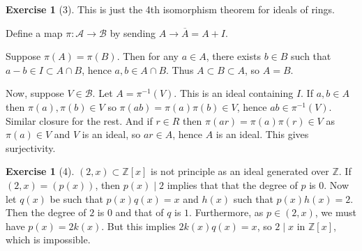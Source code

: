 \documentclass[reqno]{amsart}
\theoremstyle{definition}
\newtheorem{exercise}[theorem]{Exercise}
\theoremstyle{remark}
\begin{document}
\begin{exercise}[3]
    This is just the 4th isomorphism theorem
    for ideals of rings.

    Define a map
    $\pi \colon \mathcal{A} \to \mathcal{B}$ by
    sending $A \to \overline{A} = A + I$.

    Suppose $\pi(A) = \pi(B)$. Then
    for any $a \in A$, there exists $b \in B$ such that
    $a-b \in I \subset A \cap B$, hence
    $a,b \in A \cap B$. Thus $A \subset B \subset A$, so
    $A = B$. 

    Now, suppose $V \in \mathcal{B}$. Let
    $A = \pi^{-1}(V)$. This is an ideal containing $I$.
    If $a,b \in A$ then $\pi(a), \pi(b) \in V$ so
    $\pi(ab) = \pi(a) \pi(b) \in V$, hence
    $ab \in \pi^{-1}(V)$. Similar closure for the rest.
    And if $r \in R$ then
    $\pi\left( ar \right) =\pi(a) \pi(r) \in V$ as
    $\pi(a) \in V$ and $V$ is an ideal, so
    $ar \in A$, hence $A$ is an ideal. This gives surjectivity.
\end{exercise}

\begin{exercise}[4]
    $\left( 2,x \right) \subset \mathbb{Z}[x]$ is not principle
    as an ideal generated over $\mathbb{Z}$.
    If $\left( 2,x \right) = \left( p(x) \right) $, then
    $p(x)  \mid 2$ implies that that the
    degree of $p$ is $0$. Now
    let $q(x)$ be such that
    $p(x)q(x) = x$ and
     $h(x)$ such that $p(x) h(x) = 2$. Then
     the degree of $2$ is $0$ and that of $q$ is $1$.
     Furthermore, as $p \in \left( 2,x \right) $, we must
     have $p(x) = 2 k(x)$. But this implies
     $2 k(x) q(x) = x$, so
     $2  \mid x$ in $\mathbb{Z}[x]$, which is
     impossible.
\end{exercise}
\end{document}
